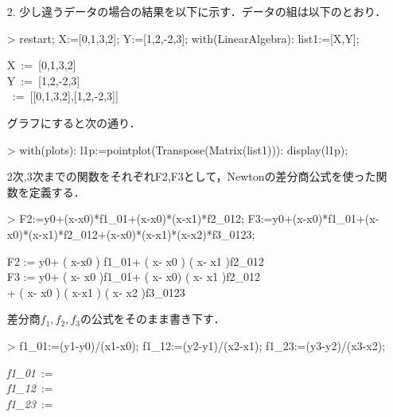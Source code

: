 \begin{itemize}
\item[2.]
少し違うデータの場合の結果を以下に示す．データの組は以下のとおり．
\begin{MapleInput}
> restart;
X:=[0,1,3,2];
Y:=[1,2,-2,3];
with(LinearAlgebra):
list1:=[X,Y];
\end{MapleInput}

\begin{MapleOutputGather}
\displaystyle X\, := \,[0,1,3,2] \notag \\
\displaystyle Y\, := \,[1,2,-2,3] \notag \\
\, := \,[[0,1,3,2],[1,2,-2,3]] \notag
\end{MapleOutputGather}
グラフにすると次の通り．
\begin{MapleInput}
> with(plots):
l1p:=pointplot(Transpose(Matrix(list1))):
display(l1p);
\end{MapleInput}
2次,3次までの関数をそれぞれF2,F3として，Newtonの差分商公式を使った関数を定義する．
\begin{MapleInput}
> F2:=y0+(x-x0)*f1_01+(x-x0)*(x-x1)*f2_012;
F3:=y0+(x-x0)*f1_01+(x-x0)*(x-x1)*f2_012+(x-x0)*(x-x1)*(x-x2)*f3_0123;
\end{MapleInput}

\begin{MapleOutputGather}
F2 := y0+ \left( x-x0 \right) f1\_01+ \left( x- x0 \right)  \left( x- x1 \right)f2\_012 \notag \\
F3 := y0+ \left( x- x0 \right)f1\_01+ \left( x- x0\right)  \left( x- x1 \right)f2\_012\notag \\
+ \left( x- x0 \right)  \left( x-x1 \right)  \left( x- x2 \right)f3\_0123 \notag
\end{MapleOutputGather}
差分商$f_1, f_2, f_3$の公式をそのまま書き下す．
\begin{MapleInput}
> f1_01:=(y1-y0)/(x1-x0);
f1_12:=(y2-y1)/(x2-x1);
f1_23:=(y3-y2)/(x3-x2);
\end{MapleInput}

\begin{MapleOutputGather}
{\it f1\_01}\, := \,{} \notag \\
{\it f1\_12}\, := \,{}\notag \\
{\it f1\_23}\, := \,{}\notag 
\end{MapleOutputGather}


\end{itemize}
